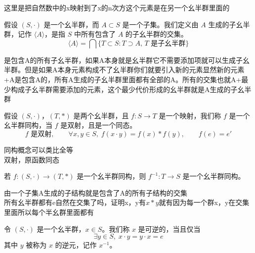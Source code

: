 \begin{note}[定义1 5幺半群的同态]
这里是把自然数中的x映射到了x的n次方这个元素是在另一个幺半群里面的
\end{note}

\begin{definition}[由子集生成的子幺半群（定义 1.6）]
假设 $(S,\cdot)$ 是一个幺半群，而 $A\subset S$ 是一个子集。我们定义由 $A$ 生成的子幺半群，记作 $\langle A\rangle$，是指 $S$ 中所有包含了 $A$ 的子幺半群的交集。
\[
\langle A\rangle=\bigcap\{T\subset S:T\supset A,\,T\text{ 是子幺半群}\}
\]
\end{definition}

\begin{note}[定义1 6由子集生成的子幺半群]
是包含A的所有子幺半群，如果A本身就是幺半群它不需要添加项就可以生成子幺半群。但是如果A本身元素构成不了幺半群你们就要引入新的元素显然新的元素+A是包含A的，所有A生成的子幺半群里面都有全部的A。所有的交集也就A+最少构成子幺半群需要添加的元素，这个最少代价形成的幺半群就是A生成的子幺半群
\end{note}

\begin{definition}[幺半群同构（定义 1.7）]
假设 $(S,\cdot)$，$(T,*)$ 是两个幺半群，且 $f:S\to T$ 是一个映射，我们称 $f$ 是一个幺半群同构，当 $f$ 是双射，且是一个同态。
\[
f\text{ 是双射},\qquad\forall x,y\in S,\;f(x\cdot y)=f(x)*f(y),\qquad f(e)=e'
\]
\end{definition}

\begin{note}[定义1 7幺半群的同构]
同构概念可以类比全等 \\
双射，原函数同态
\end{note}

\begin{proposition}[命题 1.6]
若 $f:(S,\cdot)\to(T,*)$ 是一个幺半群同构，则 $f^{-1}:T\to S$ 是一个幺半群同构。
\end{proposition}

\begin{note}[命题1 5证明A生成的子幺半群是包含A的最小子幺半群]
由一个子集A生成的子结构就是包含了A的所有子结构的交集 \\
所有幺半群都有e自然在交集了吗，证明x，y有$x*y$就有因为每一个群x，y在交集里面所以每个半幺群里面都有
\end{note}

\begin{definition}[逆元（定义 1.8）]
令 $(S,\cdot)$ 是一个幺半群，$x\in S$。我们称 $x$ 是可逆的，当且仅当
\[
\exists y\in S,\;x\cdot y=y\cdot x=e
\]
其中 $y$ 被称为 $x$ 的逆元，记作 $x^{-1}$。
\end{definition}

